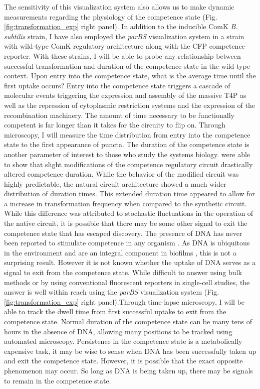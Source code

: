 The sensitivity of this visualization system also allows us to make dynamic
measurements regarding the physiology of the competence state (Fig.
\ref{fig:transformation_exp} right panel). In addition to the inducible ComK
\textit{B. subtilis} strain, I have also employed the \textit{parBS}
visualization system in a strain with wild-type ComK regulatory architecture
along with the CFP competence reporter. With these strains, I will be able to
probe any relationship between successful transformation and duration of the
competence state in the wild-type context.  Upon entry into the competence
state, what is the average time until the first uptake occurs? Entry into the
competence state triggers a cascade of molecular events triggering the
expression and assembly of the massive T4P as well as the repression of
cytoplasmic restriction systems and the expression of the recombination
machinery. The amount of time necessary to be functionally competent is far
longer than it takes for the circuity to flip on. Through microscopy, I will
measure the time distribution from entry into the competence state to the first
appearance of puncta. The duration of the competence state is another parameter
of interest to those who study the systems biology.  \citet{Cagatay:2009ie} were
able to show that slight modifications of the competence regulatory circuit
drastically altered competence duration. While the behavior of the modified
circuit was highly predictable, the natural circuit architecture showed a much
wider distribution of duration times. This extended duration time appeared to
allow for a increase in transformation frequency when compared to the synthetic
circuit. While this difference was attributed to stochastic fluctuations in the
operation of the native circuit, it is possible that there may be some other
signal to exit the competence state that has escaped discovery. The presence of
DNA has never been reported to stimulate competence in any organism
\cite{Mell:2014dj}.  As DNA is ubiquitous in the environment
\cite{DellAnno:2002uw} and are an integral component in biofilms
\cite{Tang:2013kj}, this is not a surprising result. However it is not known
whether the uptake of DNA serves as a signal to exit from the competence state.
While difficult to answer using bulk methods or by using conventional
fluorescent reporters in single-cell studies, the answer is well within reach
using the \textit{parBS} visualization system (Fig.\ref{fig:transformation_exp}
right panel).Through time-lapse microscopy, I will be able to track the dwell time
from first successful uptake to exit from the competence state. Normal duration
of the competence state can be many tens of hours in the absence of DNA,
allowing many positions to be tracked using automated microscopy. Persistence in
the competence state is a metabolically expensive task, it may be wise to sense
when DNA has been successfully taken up and exit the competence state. However,
it is possible that the exact opposite phenomenon may occur. So long as DNA is
being taken up, there may be signals to remain in the competence state.  



